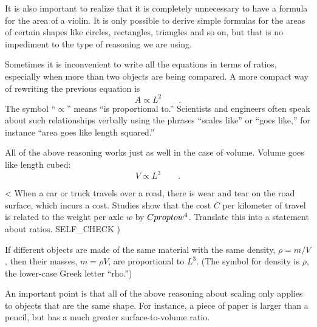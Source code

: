It is also important to realize that it is completely
unnecessary to have a formula for the area of a violin. It
is only possible to derive simple formulas for the areas of
certain shapes like circles, rectangles, triangles and so
on, but that is no impediment to the type of reasoning we are using.

Sometimes it is inconvenient to write all the equations in
terms of ratios, especially when more than two objects are
being compared. A more compact way of rewriting the
previous equation is
\begin{equation*}
   A \propto L^2 \qquad   .
\end{equation*}
The symbol ``$\propto$'' means ``is proportional to.''
Scientists and engineers often speak about such relationships
verbally using the phrases ``scales like'' or ``goes like,''
for instance ``area goes like length squared.''

All of the above reasoning works just as well in the case of
volume. Volume goes like length cubed:
\begin{equation*}
  V \propto L^3   \qquad   .
\end{equation*}

<%
When a car or truck travels over a road, there is wear and tear on the road surface, which incurs a cost.
Studies show that the cost $C$ per kilometer of travel is related to the weight per axle $w$
by $C \\propto w^4$.
Translate this into a statement about ratios.
  SELF_CHECK
  ) %


If different objects are made of the same material with the
same density, $\rho =m/V$, then their masses, $m=\rho V$,
are proportional to $L^3$. (The
symbol for density is $\rho$, the lower-case Greek letter ``rho.'')

An important point is that all of the above reasoning about
scaling only applies to objects that are the same shape. For
instance, a piece of paper is larger than a pencil, but has
a much greater surface-to-volume ratio.


